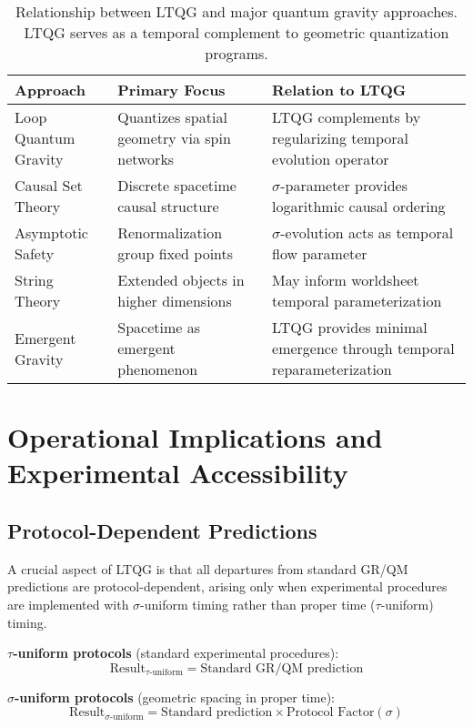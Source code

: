 \documentclass[12pt,a4paper]{article}
\begin{document}
\begin{table}[H]
\centering
\begin{tabular}{lp{6cm}p{6cm}}
\toprule
\textbf{Approach} & \textbf{Primary Focus} & \textbf{Relation to LTQG} \\
\midrule
Loop Quantum Gravity & Quantizes spatial geometry via spin networks & LTQG complements by regularizing temporal evolution operator \\
Causal Set Theory & Discrete spacetime causal structure & $\sigma$-parameter provides logarithmic causal ordering \\
Asymptotic Safety & Renormalization group fixed points & $\sigma$-evolution acts as temporal flow parameter \\
String Theory & Extended objects in higher dimensions & May inform worldsheet temporal parameterization \\
Emergent Gravity & Spacetime as emergent phenomenon & LTQG provides minimal emergence through temporal reparameterization \\
\bottomrule
\end{tabular}
\caption{Relationship between LTQG and major quantum gravity approaches. LTQG serves as a temporal complement to geometric quantization programs.}
\label{tab:qg_programs}
\end{table}

\section{Operational Implications and Experimental Accessibility}

\subsection{Protocol-Dependent Predictions}

A crucial aspect of LTQG is that all departures from standard GR/QM predictions are protocol-dependent, arising only when experimental procedures are implemented with $\sigma$-uniform timing rather than proper time ($\tau$-uniform) timing.

\textbf{$\tau$-uniform protocols} (standard experimental procedures):
\begin{equation}
\text{Result}_{\tau\text{-uniform}} = \text{Standard GR/QM prediction}
\end{equation}

\textbf{$\sigma$-uniform protocols} (geometric spacing in proper time):
\begin{equation}
\text{Result}_{\sigma\text{-uniform}} = \text{Standard prediction} \times \text{Protocol Factor}(\sigma)
\end{equation}
\end{document}
